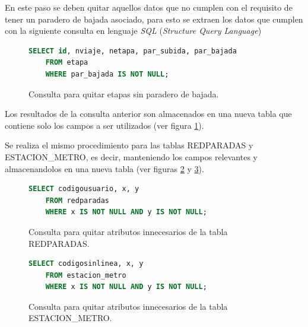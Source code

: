 \documentclass[12pt]{article}
\begin{document}
	En este paso se deben quitar aquellos datos que no cumplen con el requisito de tener un paradero de bajada asociado, para esto se extraen los datos que cumplen con la siguiente consulta en lenguaje \textit{SQL} (\textit{Structure Query Language})
	
\begin{figure}[h]
\begin{center}
\begin{lstlisting}[breaklines=true, language=SQL]
	SELECT id, nviaje, netapa, par_subida, par_bajada 
	FROM etapa 
	WHERE par_bajada IS NOT NULL;
\end{lstlisting}
\end{center}
\caption{Consulta para quitar etapas sin paradero de bajada.}
\label{fig:limpiar_datos_etapa}
\end{figure}
	
	Los resultados de la consulta anterior son almacenados en una nueva tabla que contiene solo los campos a ser utilizados (ver figura \ref{fig:limpiar_datos_etapa}).
	
	Se realiza el mismo procedimiento para las tablas REDPARADAS y ESTACION\_METRO, es decir, manteniendo los campos relevantes y almacenandolos en una nueva tabla (ver figuras   \ref{fig:limpiar_datos_redparadas} y \ref{fig:limpiar_datos_estacion_metro}).

\begin{figure}[h]
\begin{center}
\begin{lstlisting}[breaklines=true, language=SQL]
	SELECT codigousuario, x, y  
	FROM redparadas
	WHERE x IS NOT NULL AND y IS NOT NULL;
\end{lstlisting}
\end{center}
\caption{Consulta para quitar atributos innecesarios de la tabla REDPARADAS.}
\label{fig:limpiar_datos_redparadas}
\end{figure}	
	
\begin{figure}[h]
\begin{center}
\begin{lstlisting}[breaklines=true, language=SQL]
	SELECT codigosinlinea, x, y  
	FROM estacion_metro
	WHERE x IS NOT NULL AND y IS NOT NULL;
\end{lstlisting}
\end{center}
\caption{Consulta para quitar atributos innecesarios de la tabla ESTACION\_METRO.}
\label{fig:limpiar_datos_estacion_metro}
\end{figure}	
\end{document}
